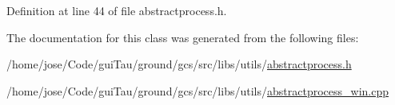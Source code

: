 Definition at line 44 of file abstractprocess.\-h.



The documentation for this class was generated from the following files\-:\begin{DoxyCompactItemize}
\item 
/home/jose/\-Code/gui\-Tau/ground/gcs/src/libs/utils/\hyperlink{abstractprocess_8h}{abstractprocess.\-h}\item 
/home/jose/\-Code/gui\-Tau/ground/gcs/src/libs/utils/\hyperlink{abstractprocess__win_8cpp}{abstractprocess\-\_\-win.\-cpp}\end{DoxyCompactItemize}

